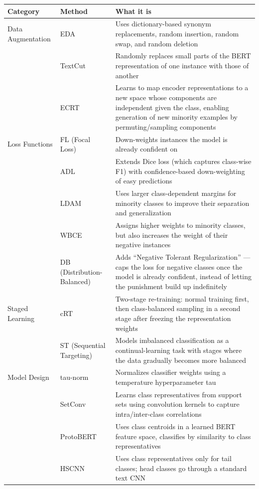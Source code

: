 \documentclass[10pt]{article}
\begin{document}
\begin{table}[!ht]
\centering
\begin{tabular}{L{3.2cm} L{2.6cm} L{9.5cm}}
\toprule
Category & Method & What it is \\
\midrule
Data Augmentation & EDA & Uses dictionary-based synonym replacements, random insertion, random swap, and random deletion \\
\cmidrule(lr){2-3}
 & TextCut & Randomly replaces small parts of the BERT representation of one instance with those of another \\
\cmidrule(lr){2-3}
 & ECRT & Learns to map encoder representations to a new space whose components are independent given the class, enabling generation of new minority examples by permuting/sampling components \\
\midrule
Loss Functions & FL (Focal Loss) & Down-weights instances the model is already confident on \\
\cmidrule(lr){2-3}
 & ADL & Extends Dice loss (which captures class-wise F1) with confidence-based down-weighting of easy predictions \\
\cmidrule(lr){2-3}
 & LDAM & Uses larger class-dependent margins for minority classes to improve their separation and generalization \\
\cmidrule(lr){2-3}
 & WBCE & Assigns higher weights to minority classes, but also increases the weight of their negative instances \\
\cmidrule(lr){2-3}
 & DB (Distribution-Balanced) & Adds ``Negative Tolerant Regularization'' --- caps the loss for negative classes once the model is already confident, instead of letting the punishment build up indefinitely \\
\midrule
Staged Learning & cRT & Two-stage re-training: normal training first, then class-balanced sampling in a second stage after freezing the representation weights \\
\cmidrule(lr){2-3}
 & ST (Sequential Targeting) & Models imbalanced classification as a continual-learning task with stages where the data gradually becomes more balanced \\
\midrule
Model Design & tau-norm & Normalizes classifier weights using a temperature hyperparameter tau \\
\cmidrule(lr){2-3}
 & SetConv & Learns class representatives from support sets using convolution kernels to capture intra/inter-class correlations \\
\cmidrule(lr){2-3}
 & ProtoBERT & Uses class centroids in a learned BERT feature space, classifies by similarity to class representatives \\
\cmidrule(lr){2-3}
 & HSCNN & Uses class representatives only for tail classes; head classes go through a standard text CNN \\
\bottomrule
\end{tabular}
\end{table}
\end{document}
